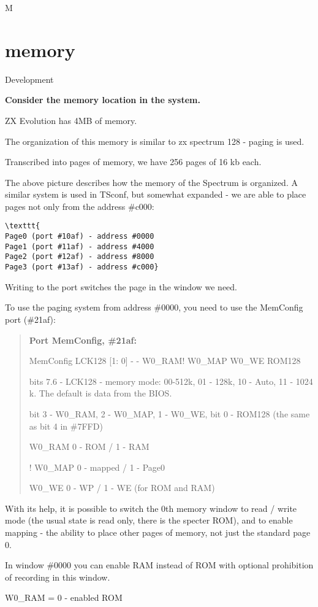 M\chapter{memory}
Development
	
\textbf{Consider the memory location in the system. }

ZX Evolution has 4MB of memory.

The organization of this memory is similar to zx spectrum 128 - paging
is used.

Transcribed into pages of memory, we have 256 pages of 16 kb
each.

The above picture describes how the memory of the Spectrum is
organized. A similar system is used in TSconf, but somewhat expanded -
we are able to place pages not only from the address \#c000:
\begin{verbatim}\texttt{
Page0 (port #10af) - address #0000
Page1 (port #11af) - address #4000
Page2 (port #12af) - address #8000
Page3 (port #13af) - address #c000}
\end{verbatim}
Writing to the port switches the page in the window we need.

To use the paging system from address \#0000, you need to use the
MemConfig port (\#21af):

\begin{quotation}\textbf{Port MemConfig, \#21af:}
 
MemConfig LCK128 [1: 0] - - W0\_RAM! W0\_MAP W0\_WE ROM128

bits 7.6 - LCK128 - memory mode: 00-512k, 01 - 128k, 10 - Auto, 11 -
1024 k. The default is data from the BIOS.

bit 3 - W0\_RAM, 2 - W0\_MAP, 1 - W0\_WE, bit 0 - ROM128 (the same as
bit 4 in \#7FFD)

W0\_RAM 0 - ROM / 1 - RAM

! W0\_MAP 0 - mapped / 1 - Page0 

W0\_WE 0 - WP / 1 - WE (for ROM and RAM)

\end{quotation}

With its help, it is possible to switch the 0th memory window to read
/ write mode (the usual state is read only, there is the specter ROM),
and to enable mapping - the ability to place other pages of memory,
not just the standard page 0.

In window \#0000 you can enable RAM instead of ROM with optional
prohibition of recording in this window.

W0\_RAM = 0 - enabled ROM

